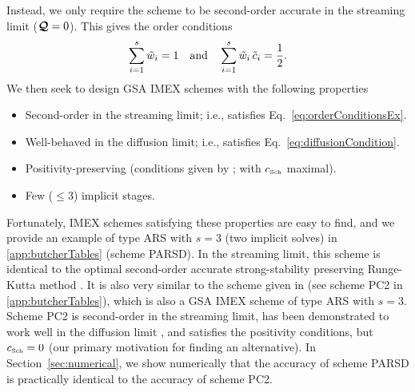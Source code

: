 Instead, we only require the scheme to be second-order accurate in the streaming limit ($\boldsymbol{\mathcal{Q}}=0$).  
This gives the order conditions
\begin{equation}
  \sum_{i=1}^{s}\tilde{w}_{i}=1
  \quad\text{and}\quad
  \sum_{i=1}^{s}\tilde{w}_{i}\,\tilde{c}_{i}=\frac{1}{2}.  
  \label{eq:orderConditionsEx}
\end{equation}
We then seek to design GSA IMEX schemes with the following properties
\begin{itemize}
  \item Second-order in the streaming limit; i.e., satisfies Eq.~\eqref{eq:orderConditionsEx}.
  \item Well-behaved in the diffusion limit; i.e., satisfies Eq.~\eqref{eq:diffusionCondition}.
  \item Positivity-preserving (conditions given by \cite{hu_etal_2017}; with $c_{\mbox{\tiny Sch}}$ maximal).
  \item Few ($\le3$) implicit stages.
\end{itemize}
Fortunately, IMEX schemes satisfying these properties are easy to find, and we provide an example of type ARS with $s=3$ (two implicit solves) in \ref{app:butcherTables} (scheme PARSD).  
In the streaming limit, this scheme is identical to the optimal second-order accurate strong-stability preserving Runge-Kutta method \cite{gottlieb_etal_2001}.  
It is also very similar to the scheme given in \cite{mcclarren_etal_2008} (see scheme PC2 in \ref{app:butcherTables}), which is also a GSA IMEX scheme of type ARS with $s=3$.  
Scheme PC2 is second-order in the streaming limit, has been demonstrated to work well in the diffusion limit \cite{mcclarren_etal_2008,radice_etal_2013}, and satisfies the positivity conditions, but $c_{\mbox{\tiny Sch}}=0$ (our primary motivation for finding an alternative).  
In Section~\ref{sec:numerical}, we show numerically that the accuracy of scheme PARSD is practically identical to the accuracy of scheme PC2.  